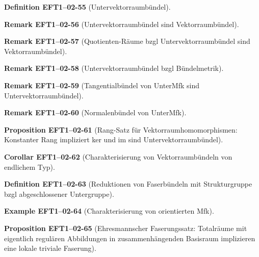 \documentclass[10pt, letterpaper]{article}
\newcommand{\CustomHeading}[3]{%
  \par\medskip\noindent%
  \textbf{#1 #2} \textnormal{(#3)}.\enskip%
}
\newenvironment{DEF}[2]{\CustomHeading{Definition}{#1}{#2}}{}
\newenvironment{PROP}[2]{\CustomHeading{Proposition}{#1}{#2}}{}
\newenvironment{KORO}[2]{\CustomHeading{Corollar}{#1}{#2}}{}
\newenvironment{REM}[2]{\CustomHeading{Remark}{#1}{#2}}{}
\newenvironment{EXA}[2]{\CustomHeading{Example}{#1}{#2}}{}
\begin{document}
\begin{DEF}{EFT1--02-55}{Untervektorraumbündel}
\end{DEF}

\begin{REM}{EFT1--02-56}{Untervektorraumbündel sind Vektorraumbündel}
\end{REM}

\begin{REM}{EFT1--02-57}{Quotienten-Räume bzgl Untervektorraumbündel sind Vektorraumbündel}
\end{REM}

\begin{REM}{EFT1--02-58}{Untervektorraumbündel bzgl Bündelmetrik}
\end{REM}

\begin{REM}{EFT1--02-59}{Tangentialbündel von UnterMfk sind Untervektorraumbündel}
\end{REM}

\begin{REM}{EFT1--02-60}{Normalenbündel von UnterMfk}
\end{REM}

\begin{PROP}{EFT1--02-61}{Rang-Satz für Vektorraumhomomorphismen: Konstanter Rang impliziert ker und im sind Untervektorraumbündel}
\end{PROP}

\begin{KORO}{EFT1--02-62}{Charakterisierung von Vektorraumbündeln von endlichem Typ}
\end{KORO}

\begin{DEF}{EFT1--02-63}{Reduktionen von Faserbündeln mit Strukturgruppe bzgl abgeschlossener Untergruppe}
\end{DEF}

\begin{EXA}{EFT1--02-64}{Charakterisierung von orientierten Mfk}
\end{EXA}

\begin{PROP}{EFT1--02-65}{Ehresmannscher Faserungssatz: Totalräume mit eigentlich regulären Abbildungen in zusammenhängenden Basisraum implizieren eine lokale triviale Faserung}
\end{PROP}
\end{document}
